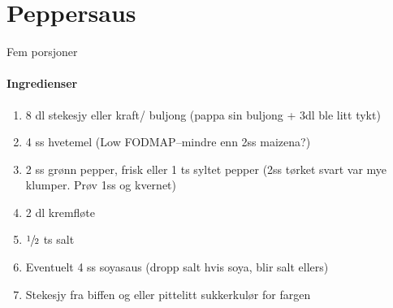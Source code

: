 \section{﻿Peppersaus}
\label{peppersaus}
Fem porsjoner

\paragraph{Ingredienser}
\begin{enumerate}[noitemsep]
	\item 8 dl stekesjy eller kraft/ buljong (pappa sin buljong + 3dl ble litt tykt)
	\item 4 ss hvetemel (Low FODMAP--mindre enn 2ss maizena?)
	\item 2 ss grønn pepper, frisk eller 1 ts syltet pepper (2ss tørket svart var mye klumper.  Prøv 1ss og kvernet)
	\item 2 dl kremfløte
	\item  $\sfrac{1}{2}$  ts salt
	\item Eventuelt 4 ss soyasaus (dropp salt hvis soya, blir salt ellers)
	\item Stekesjy fra biffen og eller pittelitt sukkerkulør for fargen
\end{enumerate}
